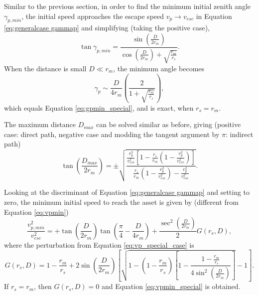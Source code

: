 \documentclass{article}
\begin{document}
Similar to the previous section, in order to find the minimum initial zenith angle $\gamma_{p,min}$, the initial speed approaches the escape speed $v_p\to v_{esc}$ in Equation \eqref{eq:generalcase gammap} and simplifying (taking the positive case),
\begin{equation}
\tan\gamma_{p,min} = \frac{\sin\left(\frac{D}{2r_m}\right)}{\cos\left(\frac{D}{2r_m}\right)+\sqrt{\frac{r_m}{r_s}}}.
\end{equation}
When the distance is small $D\ll r_m$, the minimum angle becomes
\begin{equation}
\gamma_p \sim \frac{D}{4r_m}\left(\frac{2}{1+\sqrt{\frac{r_m}{r_s}}}\right),
\end{equation}
which equals Equation \eqref{eq:gpmin_special}, and is exact, when $r_s = r_m$.


The maximum distance $D_{max}$ can be solved similar as before, giving (positive case: direct path, negative case and modding the tangent argument by $\pi$: indirect path)
\begin{equation}
\tan\left(\frac{D_{max}}{2r_m}\right) = \pm\sqrt{\frac{\frac{v_p^2}{v_{esc}^2}\left[1-\frac{r_s}{r_m}\left(1-\frac{v_p^2}{v_{esc}^2}\right)\right]}{\frac{r_s}{r_m}\left(1-\frac{v_p^2}{v_{esc}^2}\right)-\frac{v_p^2}{v_{esc}^2}}}.
\end{equation}

Looking at the discriminant of Equation \eqref{eq:generalcase gammap} and setting to zero, the minimum initial speed to reach the asset is given by (different from Equation \eqref{eq:vpmin})
\begin{equation}\label{eq:vpmin_general}
\frac{v_{p,min}^2}{v_{esc}^2} = +\tan\left(\frac{D}{2r_m}\right)\tan\left(\frac{\pi}{4}- \frac{D}{4r_m}\right) + \frac{\sec^2\left(\frac{D}{2r_m}\right)}{2} G(r_s, D),
\end{equation}
where the perturbation from Equation \eqref{eq:vp_special_case} is
\begin{equation}
G(r_s, D) = 1-\frac{r_m}{r_s} + 2\sin\left(\frac{D}{2r_m}\right)\left[\sqrt{1 - \left(1-\frac{r_m}{r_s}\right)\left[1 - \frac{1-\frac{r_m}{r_s}}{4\sin^2\left(\frac{D}{2r_m}\right)}\right]} - 1\right].
\end{equation}
If $r_s=r_m$, then $G(r_s,D) = 0$ and Equation \eqref{eq:vpmin_special} is obtained.
\end{document}
